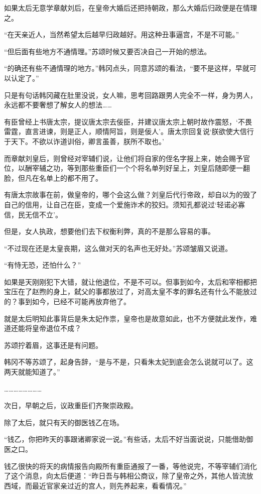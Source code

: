 如果太后无意学章献刘后，在皇帝大婚后还把持朝政，那么大婚后归政便是在情理之。

“在天亲近人，当然希望太后越早归政越好。用这种丑事逼宫，不是不可能。”

“但后面有些地方不通情理。”苏颂时候又要否决自己一开始的想法。

“的确还有些不通情理的地方。”韩冈点头，同意苏颂的看法，“要不是这样，早就可以认定了。”

只是有句话韩冈藏在肚里没说，女人嘛，思考回路跟男人完全不一样，身为男人，永远都不要奢想了解女人的想法……

有臣曾经上书唐太宗，提议唐太宗去佞臣，并建议唐太宗上朝时故作震怒，‘不畏雷霆，直言进谏，则是正人，顺情阿旨，则是佞人’。唐太宗回复说‘朕欲使大信行于天下。不欲以诈道训俗，卿言虽善，朕所不取也。’

而章献刘皇后，则曾经对宰辅们说，让他们将自家的侄名字报上来，她会赐予官位，以酬宰辅之功，等到那些重臣们一个个将名单列好呈上，刘皇后随即便一翻脸，但凡在名单上的都不用了。

有唐太宗故事在前，做皇帝的，哪个会这么做？刘皇后代行帝政，却自以为的毁了自己的信用，让自己在臣，变成一个爱施诈术的狡妇。须知孔都说过‘轻诺必寡信，民无信不立’。

但是，女人执政，想要他们去下权衡利弊，真的不是那么容易的事。

“不过现在还是太皇丧期，这么做对天的名声也无好处。”苏颂皱眉又说道。

“有恃无恐，还怕什么？”

如果是天刚刚犯下大错，就让他退位，不是不可以。但事到如今，太后和宰相都把宝压在了赵煦的身上，弑父的事都放过了，对高太皇不孝的罪名还有什么不能放过的？事到如今，已经不可能再放弃他了。

就是太后明知此事背后是朱太妃作祟，皇帝也是故意如此，也不方便就此发作，难道还能将皇帝退位不成？

苏颂拧着眉，这事还是有问题。

韩冈不等苏颂了，起身告辞，“是与不是，只看朱太妃到底会怎么说就可以了。这两天就能知道了。”

……………………

次日，早朝之后，议政重臣们齐聚崇政殿。

除了太后，就只有天的御医钱乙在场。

“钱乙，你把昨天的事跟诸卿家说一说。”有些话，太后不好当面说说，只能借助御医之口。

钱乙很快的将天的病情报告向殿所有重臣通报了一番，等他说完，不等宰辅们消化了这个消息，向太后便道：“昨日吾与韩相公商议，除了皇帝之外，其他人皆流放西域，而最近官家亲过近的宫人，则先养起来，看看情况。”

